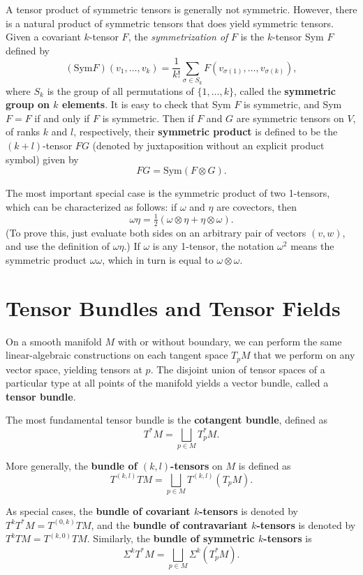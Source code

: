 A tensor product of symmetric tensors is generally not symmetric. However, there is a natural product of symmetric tensors that does yield symmetric tensors. Given a covariant $k$-tensor $F$, the \textit{symmetrization of} $F$ is the $k$-tensor Sym $F$ defined by
\[
(\text{Sym} F)(v_1,\ldots,v_k) = \frac{1}{k!} \sum_{\sigma \in S_k} F(v_{\sigma(1)},\ldots,v_{\sigma(k)}),
\]
where $S_k$ is the group of all permutations of $\{1,\ldots,k\}$, called the \textbf{symmetric group on $k$ elements}. It is easy to check that Sym $F$ is symmetric, and Sym $F = F$ if and only if $F$ is symmetric. Then if $F$ and $G$ are symmetric tensors on $V$, of ranks $k$ and $l$, respectively, their \textbf{symmetric product} is defined to be the $(k + l)$-tensor $FG$ (denoted by juxtaposition without an explicit product symbol) given by
\[
FG = \text{Sym}(F \otimes G).
\]

The most important special case is the symmetric product of two 1-tensors, which can be characterized as follows: if $\omega$ and $\eta$ are covectors, then
\[
\omega\eta = \tfrac{1}{2}(\omega \otimes \eta + \eta \otimes \omega).
\]
(To prove this, just evaluate both sides on an arbitrary pair of vectors $(v, w)$, and use the definition of $\omega\eta$.) If $\omega$ is any 1-tensor, the notation $\omega^2$ means the symmetric product $\omega\omega$, which in turn is equal to $\omega \otimes \omega$.

\section{Tensor Bundles and Tensor Fields}

On a smooth manifold $M$ with or without boundary, we can perform the same linear-algebraic constructions on each tangent space $T_p M$ that we perform on any vector space, yielding tensors at $p$. The disjoint union of tensor spaces of a particular type at all points of the manifold yields a vector bundle, called a \textbf{tensor bundle}.

The most fundamental tensor bundle is the \textbf{cotangent bundle}, defined as
\[
T^* M = \bigsqcup_{p \in M} T_p^* M.
\]

More generally, the \textbf{bundle of $(k,l)$-tensors} on $M$ is defined as
\[
T^{(k,l)} TM = \bigsqcup_{p \in M} T^{(k,l)}(T_p M).
\]

As special cases, the \textbf{bundle of covariant $k$-tensors} is denoted by $T^k T^* M = T^{(0,k)} TM$, and the \textbf{bundle of contravariant $k$-tensors} is denoted by $T^k TM = T^{(k,0)} TM$. Similarly, the \textbf{bundle of symmetric $k$-tensors} is
\[
\Sigma^k T^* M = \bigsqcup_{p \in M} \Sigma^k(T_p^* M).
\]

